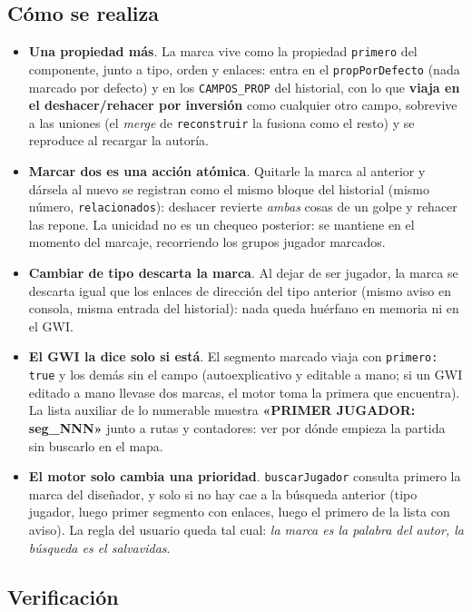 \subsection{Cómo se realiza}
\label{subsec:RealizacionF3I3}

\begin{itemize}
	\item \textbf{Una propiedad más}. La marca vive como la propiedad
	\texttt{primero} del componente, junto a tipo, orden y enlaces: entra en el
	\texttt{propPorDefecto} (nada marcado por defecto) y en los \texttt{CAMPOS\_PROP} del
	historial, con lo que \textbf{viaja en el deshacer/rehacer por inversión} como
	cualquier otro campo, sobrevive a las uniones (el \emph{merge} de \texttt{reconstruir}
	la fusiona como el resto) y se reproduce al recargar la autoría.
	\item \textbf{Marcar dos es una acción atómica}. Quitarle la marca al anterior y
	dársela al nuevo se registran como el mismo bloque del historial (mismo número,
	\texttt{relacionados}): deshacer revierte \emph{ambas} cosas de un golpe y rehacer
	las repone. La unicidad no es un chequeo posterior: se mantiene en el momento del
	marcaje, recorriendo los grupos jugador marcados.
	\item \textbf{Cambiar de tipo descarta la marca}. Al dejar de ser jugador, la marca
	se descarta igual que los enlaces de dirección del tipo anterior (mismo aviso en
	consola, misma entrada del historial): nada queda huérfano en memoria ni en el GWI.
	\item \textbf{El GWI la dice solo si está}. El segmento marcado viaja con
	\texttt{primero: true} y los demás sin el campo (autoexplicativo y editable a mano;
	si un GWI editado a mano llevase dos marcas, el motor toma la primera que encuentra).
	La lista auxiliar de lo numerable muestra \textbf{«PRIMER JUGADOR: seg\_NNN»} junto a
	rutas y contadores: ver por dónde empieza la partida sin buscarlo en el mapa.
	\item \textbf{El motor solo cambia una prioridad}. \texttt{buscarJugador} consulta
	primero la marca del diseñador, y solo si no hay cae a la búsqueda anterior (tipo
	jugador, luego primer segmento con enlaces, luego el primero de la lista con aviso).
	La regla del usuario queda tal cual: \emph{la marca es la palabra del autor, la
		búsqueda es el salvavidas}.
\end{itemize}

\subsection{Verificación}
\label{subsec:VerificacionF3I3}


